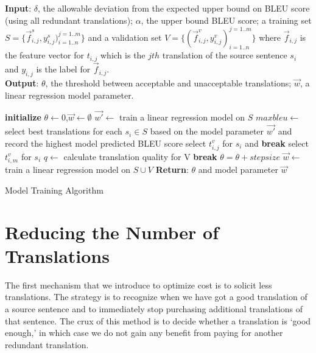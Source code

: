 \documentclass[11pt,letterpaper]{article}
\begin{document}
\begin{algorithm}[h!]
\textbf{Input}: $\delta$, the allowable deviation from the expected upper bound on BLEU score (using all redundant translations); $\alpha$, the upper bound BLEU score; a training set $S = \{\vec f^{s}_{i,j},y^{s}_{i,j})_{i=1..n}^{j=1..m}\}$ and a validation set $V = \{(\vec f^{v}_{i,j},y^{v}_{i,j})_{i=1..n}^{j=1..m}\}$ where $\vec f_{i,j}$ is the feature vector for $t_{i,j}$ which is the $jth$ translation of the source sentence $s_{i}$ and $y_{i,j}$ is the label for $\vec f_{i,j}$.\\
\textbf{Output}: $\theta$, the threshold between acceptable and unacceptable translations; $\vec{w}$, a linear regression model parameter. 
\begin{algorithmic}[1]
\State \textbf{initialize} $\theta \leftarrow 0$,$\vec{w}\leftarrow \emptyset$ 
\State $\vec{w'}\leftarrow$ train a linear regression model on $S$
\State $maxbleu \leftarrow$ select best translations for each $s_i \in S$ based on the model parameter $\vec{w'}$ and record the highest model predicted BLEU score
             select $t^{v}_{i,j}$ for $s_i$ and \textbf{break}
\EndIf
{} select $t^{v}_{i,m}$ for $s_i$
\EndIf
\EndFor
\EndFor
\State $q \leftarrow$ calculate translation quality for V
 \textbf{break}
\Else \text{  } $\theta = \theta + stepsize$
\EndIf
\EndWhile
\State $\vec {w} \leftarrow$ train a linear regression model on $S \cup V$
\State \textbf{Return}: $\theta$ and model parameter $\vec{w}$
\end{algorithmic}
\caption{Model Training Algorithm}\label{modelselection}
\end{algorithm}



\section{Reducing the Number of Translations}
The first mechanism that we introduce to optimize cost is to solicit less translations.  The strategy is to recognize when we have got a good translation of a source sentence and to immediately stop purchasing additional  translations of that sentence.  The crux of this method is to decide whether a translation  is `good enough,' in which case we do not gain any benefit from  paying for another redundant translation.  
\end{document}
